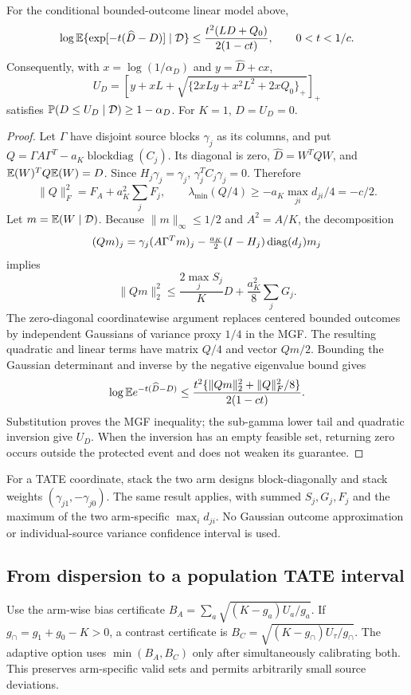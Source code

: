 \begin{proposition}
For the conditional bounded-outcome linear model above,
\[
 \log\mathbb E\{\exp[-t(\widehat D-D)]\mid\mathcal D\}
 \le\frac{t^2(LD+Q_0)}{2(1-ct)},\qquad 0<t<1/c.
\]
Consequently, with $x=\log(1/\alpha_D)$ and $y=\widehat D+cx$,
\[
 U_D=\left[y+xL+\sqrt{\{2xLy+x^2L^2+2xQ_0\}_+}\right]_+
\]
satisfies $\mathbb P(D\le U_D\mid\mathcal D)\ge1-\alpha_D$.
For $K=1$, $D=U_D=0$.
\end{proposition}
\begin{proof}
Let $\Gamma$ have disjoint source blocks $\gamma_j$ as its columns, and put
$Q=\Gamma A\Gamma^T-a_K\operatorname{blockdiag}(C_j)$. Its diagonal is zero,
$\widehat D=W^TQW$, and $\mathbb E(W)^TQ\mathbb E(W)=D$. Since $H_j\gamma_j=\gamma_j$,
$\gamma_j^TC_j\gamma_j=0$. Therefore
\[
 \|Q\|_F^2=F_A+a_K^2\sum_jF_j,\qquad
 \lambda_{\min}(Q/4)\ge-a_K\max_{ji}d_{ji}/4=-c/2.
\]
Let $m=\mathbb E(W\mid\mathcal D)$. Because $\|m\|_\infty\le1/2$ and
$A^2=A/K$, the decomposition
\[
 (Qm)_j=\gamma_j(A\Gamma^Tm)_j
       -\tfrac{a_K}2(I-H_j)\operatorname{diag}(d_j)m_j
\]
implies
\[
 \|Qm\|_2^2\le \frac{2\max_jS_j}{K}D+\frac{a_K^2}{8}\sum_jG_j.
\]
The zero-diagonal coordinatewise argument replaces centered bounded outcomes
by independent Gaussians of variance proxy $1/4$ in the MGF. The resulting
quadratic and linear terms have matrix $Q/4$ and vector $Qm/2$. Bounding the
Gaussian determinant and inverse by the negative eigenvalue bound gives
\[
 \log\mathbb E e^{-t(\widehat D-D)}
 \le\frac{t^2\{\|Qm\|_2^2+\|Q\|_F^2/8\}}{2(1-ct)}.
\]
Substitution proves the MGF inequality; the sub-gamma lower tail and quadratic
inversion give $U_D$. When the inversion has an empty feasible set, returning
zero occurs outside the protected event and does not weaken its guarantee.
\end{proof}

For a TATE coordinate, stack the two arm designs block-diagonally and stack
weights $(\gamma_{j1},-\gamma_{j0})$. The same result applies, with summed
$S_j,G_j,F_j$ and the maximum of the two arm-specific $\max_i d_{ji}$.
No Gaussian outcome approximation or individual-source variance confidence
interval is used.

\subsection{From dispersion to a population TATE interval}

Use the arm-wise bias certificate
$B_A=\sum_a\sqrt{(K-g_a)U_a/g_a}$. If $g_\cap=g_1+g_0-K>0$, a contrast
certificate is $B_C=\sqrt{(K-g_\cap)U_\tau/g_\cap}$. The adaptive option
uses $\min(B_A,B_C)$ only after simultaneously calibrating both. This preserves
arm-specific valid sets and permits arbitrarily small source deviations.

